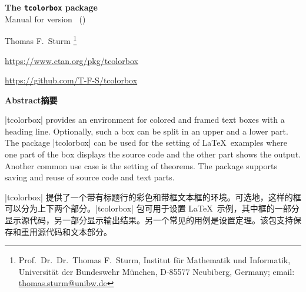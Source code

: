 \tcbuselistingtext


\clearpage
\begin{center}
\begin{tcolorbox}[enhanced,hbox,tikznode,left=8mm,right=8mm,boxrule=0.4pt,
  colback=white,colframe=black!50!yellow,
  drop lifted shadow=black!50!yellow,arc is angular,
  before=\par\vspace*{5mm},after=\par\bigskip]
{\bfseries\LARGE The \texttt{tcolorbox} package}\\[3mm]
{\large Manual for version \version\ (\datum)}
\end{tcolorbox}
{\large Thomas F.~Sturm%
  \footnote{Prof.~Dr.~Dr.~Thomas F.~Sturm, Institut f\"{u}r Mathematik und Informatik,
    Universit\"{a}t der Bundeswehr M\"{u}nchen, D-85577 Neubiberg, Germany;
     email: \href{mailto:thomas.sturm@unibw.de}{thomas.sturm@unibw.de}}\par\medskip
\normalsize\url{https://www.ctan.org/pkg/tcolorbox}\par
\url{https://github.com/T-F-S/tcolorbox}}
\end{center}
\bigskip
\begin{absquote}
  \begin{center}\bfseries Abstract摘要\end{center}


|tcolorbox| provides an environment for colored and framed text boxes with a
heading line. Optionally, such a box can be split in an upper and a lower
part. The package |tcolorbox| can be used for the setting of \LaTeX\ examples where
one part of the box displays the source code and the other part shows the
output. Another common use case is the setting of theorems. The package supports
saving and reuse of source code and text parts.






|tcolorbox| 提供了一个带有标题行的彩色和带框文本框的环境。可选地，这样的框可以分为上下两个部分。|tcolorbox| 包可用于设置 \LaTeX\ 示例，其中框的一部分显示源代码，另一部分显示输出结果。另一个常见的用例是设置定理。该包支持保存和重用源代码和文本部分。
\end{absquote}


